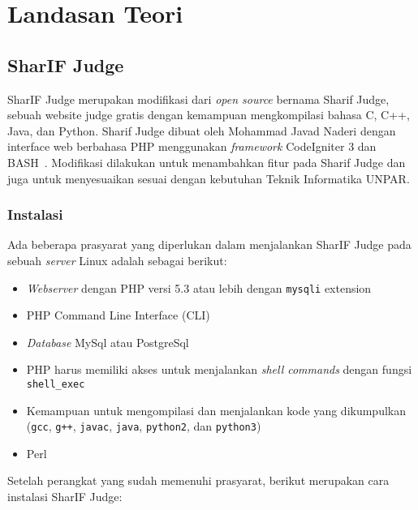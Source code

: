 \chapter{Landasan Teori}
\label{chap:teori}


\section{SharIF Judge}
\label{sec:2:sharifjudge}

SharIF Judge merupakan modifikasi dari \textit{open source} bernama Sharif Judge, sebuah website judge gratis dengan kemampuan mengkompilasi bahasa C, C++, Java, dan Python. Sharif Judge dibuat oleh Mohammad Javad Naderi dengan interface web berbahasa PHP menggunakan \textit{framework} CodeIgniter 3 dan BASH~\cite{javed:sharif}. Modifikasi dilakukan untuk menambahkan fitur pada Sharif Judge dan juga untuk menyesuaikan sesuai dengan kebutuhan Teknik Informatika UNPAR.

\subsection{Instalasi}
\label{sub:2:1:instalasi}

Ada beberapa prasyarat yang diperlukan dalam menjalankan SharIF Judge pada sebuah \textit{server} Linux adalah sebagai berikut:

\begin{itemize}
	\item \textit{Webserver} dengan PHP versi 5.3 atau lebih dengan \texttt{mysqli} extension
	\item PHP Command Line Interface (CLI)
	\item \textit{Database} MySql atau PostgreSql
	\item PHP harus memiliki akses untuk menjalankan \textit{shell commands} dengan fungsi \verb|shell_exec|
	\item Kemampuan untuk mengompilasi dan menjalankan kode yang dikumpulkan (\texttt{gcc}, \texttt{g++}, \texttt{javac}, \texttt{java}, \texttt{python2}, dan \texttt{python3})
	\item Perl
\end{itemize}

Setelah perangkat yang sudah memenuhi prasyarat, berikut merupakan cara instalasi SharIF Judge:

